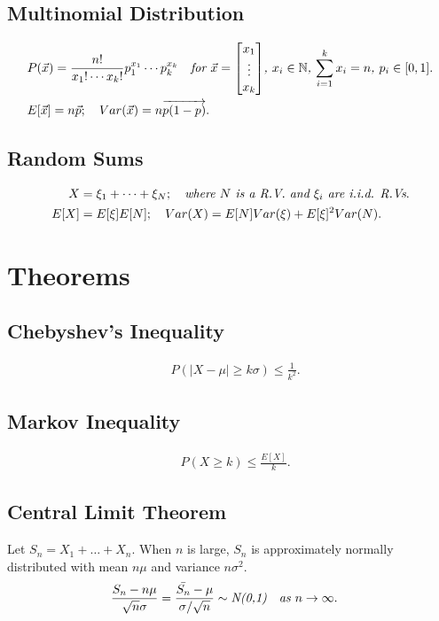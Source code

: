 \documentclass{article}
\begin{document}
\subsection{Multinomial Distribution}
\begin{align*}
    & P(\vec{x}) = \frac{n!}{x_1!\cdots x_k!}p_1^{x_1}\cdots p_k^{x_k} \quad \emph{for $\vec{x} = \begin{bmatrix}
        x_1 \\ \vdots \\ x_k
    \end{bmatrix}$, $x_i\in \mathbb{N}$, $\sum_{i=1}^k x_i = n$, $p_i\in [0,1]$}. \\
    & E[\vec{x}] = n\vec{p}; \quad Var(\vec{x}) = n\overrightarrow{p(1-p)}.
\end{align*}

\subsection{Random Sums}
\begin{align*}
    X & = \xi_1 + \dots + \xi_N; \quad \emph{where $N$ is a R.V. and $\xi_i$ are i.i.d. R.Vs}. \\
    E[X] & = E[\xi]E[N]; \quad Var(X) = E[N]Var(\xi) + E[\xi]^2Var(N).
\end{align*}

\newpage
\section{Theorems}
\subsection{Chebyshev's Inequality}
\begin{align*}
    & P(|X-\mu| \ge k\sigma) \le \frac{1}{k^2}.
\end{align*}

\subsection{Markov Inequality}
\begin{align*}
    & P(X \ge k) \le \frac{E[X]}{k}.
\end{align*}

\subsection{Central Limit Theorem}
Let $S_n = X_1 + \dots + X_n$. When $n$ is large, $S_n$ is approximately normally distributed with mean $n\mu $ and variance $n\sigma^2$.
\begin{align*}
    & \frac{S_n-n\mu}{\sqrt{n}\sigma} = \frac{\bar{S_n} - \mu}{\sigma / \sqrt{n}} \sim \emph{N(0,1)} \quad \emph{as $n\to\infty$}.
\end{align*}
\end{document}
